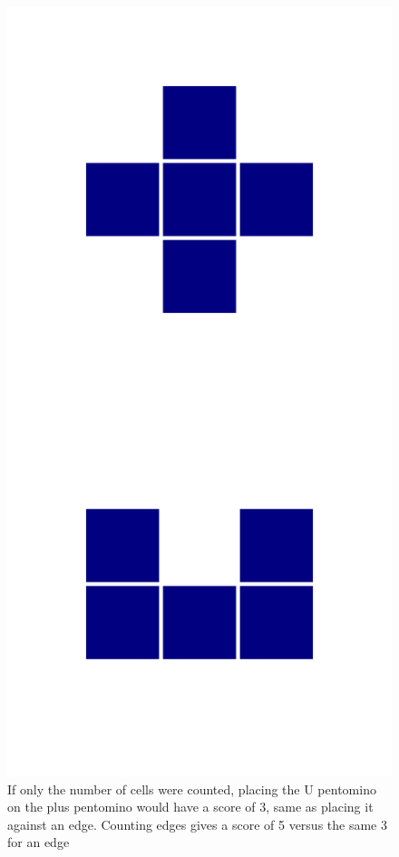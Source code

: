 \documentclass{beamer}
\begin{document}
\begin{frame}
  \begin{figure}
\center
\includegraphics[scale=0.05]{pentomino.jpg}
\caption{If only the number of cells were counted, placing the U pentomino on the plus pentomino would have a score of 3, same as placing it against an edge. Counting edges gives a score of 5 versus the same 3 for an edge}
\label{fig:plusu}
\end{figure}
\end{frame}
\end{document}
